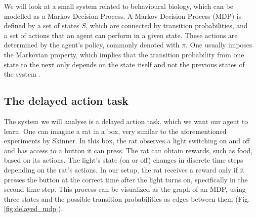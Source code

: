 \documentclass[12pt,a4paper]{article}
\begin{document}
We will look at a small system related to behavioural biology, which can be modelled as a Markov Decision Process.
A Markov Decision Process (MDP) \autocite{bellman1957MDP} is defined by a set of states $S$, which are connected by transition probabilities, and a set of actions that an agent can perform in a given state.
These actions are determined by the agent's policy, commonly denoted with $\pi$.
One usually imposes the Markovian property, which implies that the transition probability from one state to the next only depends on the state itself and not the previous states of the system \autocite{cover1999elements}.

\subsection{The delayed action task} \label{ssec:delayed_action_mdp}
The system we will analyse is a delayed action task, which we want our agent to learn.
One can imagine a rat in a box, very similar to the aforementioned experiments by Skinner.
In this box, the rat observes a light switching on and off and has access to a button it can press.
The rat can obtain rewards, such as food, based on its actions. The light's state (on or off) changes in discrete time steps depending on the rat's actions.
In our setup, the rat receives a reward only if it presses the button at the correct time after the light turns on, specifically in the second time step.
This process can be visualized as the graph of an MDP, using three states and the possible transition probabilities as edges between them (Fig. \ref{fig:delayed_mdp}).
\end{document}
